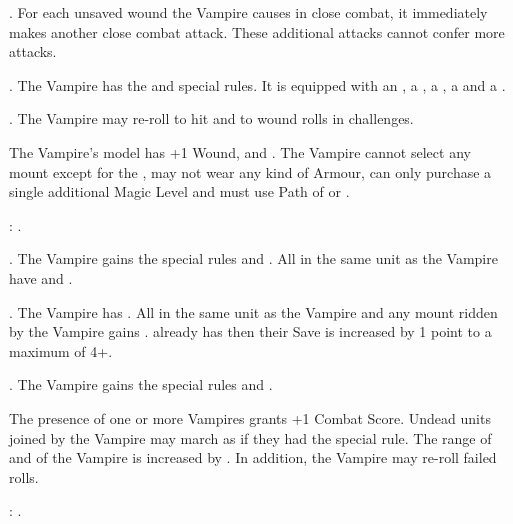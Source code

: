 \startpricelist

 \textbf{\ancientbloodpower}. For each unsaved wound the Vampire causes in close combat, it immediately makes another close combat attack. These additional attacks cannot confer more attacks.

 \textbf{\bloodlinepower}. The Vampire has the \weaponmaster{} and  special rules. It is equipped with an \ahw , a \halberd , a \gw , a \lance{} and a \shield{}.

 \textbf{\bloodlinepower}. The Vampire may re-roll to hit and to wound rolls in challenges.

\endpricelist


\noindent\parbox{\columnwidth}{
The Vampire's model has +1 Wound,  and \hatred{}. The Vampire cannot select any mount except for the \shriekinghorror{}, may not wear any kind of Armour, can only purchase a single additional Magic Level and must use Path of \wilderness{} or \necromancy{}.

\bloodties{}: \ghouls{}.
}

\startpricelist

 \textbf{\ancientbloodpower}. The Vampire gains the special rules \poisonedattacks and . All \ghouls{} in the same unit as the Vampire have \hatred{} and
.

 \textbf{\bloodlinepower}. The Vampire has . All \ghouls{} in the same unit as the Vampire and any mount ridden by the Vampire gains .  already has \regeneration{} then their \regeneration{} Save is increased by 1 point to a maximum of 4+.

 \textbf{\bloodlinepower}. The Vampire gains the special rules \thunderouscharge{} and .

\endpricelist

\separator


\noindent\parbox{\columnwidth}{
The presence of one or more \vonkarnstein{} Vampires grants +1 Combat Score. Undead units joined by the Vampire may march as if they had the \vampiric{} special rule. The range of \inspiringpresence{} and \holdyourground{} of the Vampire is increased by . In addition, the Vampire may re-roll failed \vampiric{} rolls.

\bloodties{}: \darkcoach{}.
}

